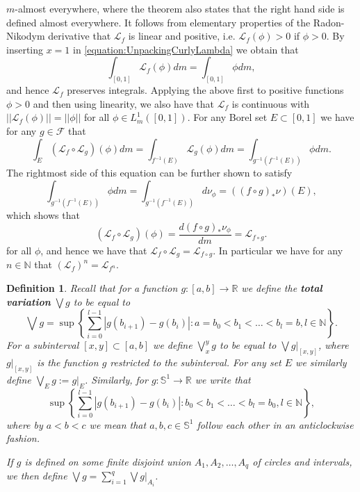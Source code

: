 \documentclass[pdftex,11pt,a4paper,oneside]{article}
\theoremstyle{plain}
\newtheorem{definition}{Definition}[section]
\newcommand{\rstr}[2]{\left. #1 \right\rvert_{#2}}
\begin{document}
$m$-almost everywhere, where the theorem also states that the right hand side is defined almost everywhere. It follows from  elementary properties of the Radon-Nikodym derivative that $\mathcal{L}_f$ is linear and positive, i.e. $\mathcal{L}_f(\phi) >0$ if $\phi>0$.
By inserting $x=1$ in \eqref{equation:UnpackingCurlyLambda} we obtain that
\begin{equation}\label{eq:TransferOPPreservesIntegrals}
    \int_{[0,1]} \mathcal{L}_f(\phi) dm = \int_{[0,1]} \phi dm,
\end{equation}
and hence $\mathcal{L}_f$ preserves integrals. Applying the above first to positive functions $\phi>0$ and then using linearity, we also have that $\mathcal{L}_f$ is continuous with $||\mathcal{L}_f(\phi)|| = ||\phi||$ for all $\phi \in L^1_m([0,1])$. For any Borel set $E\subset [0,1]$ we have for any $g\in\mathcal{F}$ that
\[\int_E \left(\mathcal{L}_{f}\circ \mathcal{L}_{g}\right)(\phi) dm = \int_{f^{-1}(E)} \mathcal{L}_g(\phi) dm = \int_{g^{-1}(f^{-1}(E))} \phi dm .\]
The rightmost side of this equation can be further shown to satisfy
\[\int_{g^{-1}(f^{-1}(E))} \phi dm = \int_{g^{-1}(f^{-1}(E))} d\nu_\phi = \left((f\circ g)_*\nu\right)(E),\]
which shows that 
\[(\mathcal{L}_f\circ\mathcal{L}_g)(\phi) = \frac{d(f\circ g)_*\nu_{\phi}}{dm}=\mathcal{L}_{f\circ g}.\]
for all $\phi$, and hence we have that $\mathcal{L}_f\circ\mathcal{L}_g=\mathcal{L}_{f\circ g}$.
In particular we have for any $n\in\mathbb{N}$ that $\left(\mathcal{L}_{f}\right)^n = \mathcal{L}_{f^n}$.

\begin{definition}
Recall that for a function $g:[a,b]\to\mathbb{R}$ we define the \textbf{total variation} $\bigvee g$ to be equal to 
\[\bigvee g = \sup\left\{ \sum_{i=0}^{l-1} |g(b_{i+1})-g(b_i)|: a=b_0<b_1<\ldots<b_l =b, l\in\mathbb{N} \right\}.\]
For a subinterval $[x,y]\subset [a,b]$ we define $\bigvee_x^y g$ to be equal to $\bigvee \rstr{g}{[x,y]}$, where $\rstr{g}{[x,y]}$ is the function $g$ restricted to the subinterval. For any set $E$ we similarly define $\bigvee_E g:= \rstr{g}{E}$. Similarly, for $g:\mathbb{S}^1\to \mathbb{R}$ we write that 
\[\sup\left\{ \sum_{i=0}^{l-1} |g(b_{i+1})-g(b_i)|: b_0<b_1<\ldots<b_l =b_0, l\in\mathbb{N} \right\},\]
where by $a<b<c$ we mean that $a,b,c\in \mathbb{S}^1$ follow each other in an anticlockwise fashion.

If $g$ is defined on some finite disjoint union $A_1,A_2,\ldots,A_q$ of circles and intervals, we then define $\bigvee g = \sum_{i=1}^q \bigvee \rstr{g}{A_i}$. 
\end{definition} 
 
\end{document}
